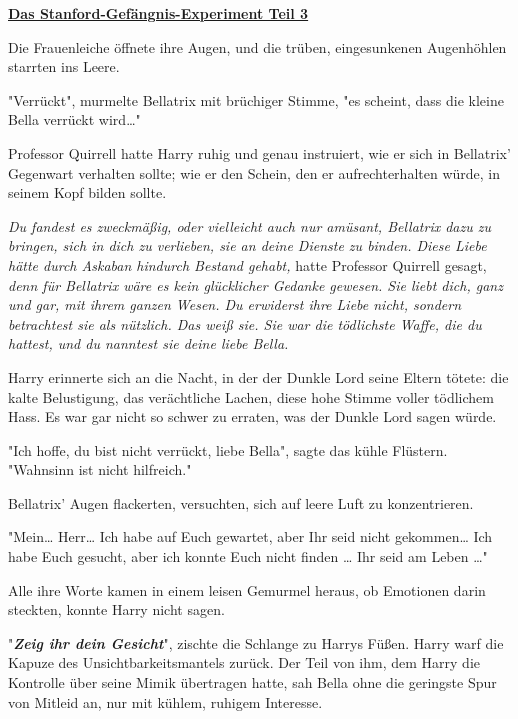 

\hypertarget{das-stanford-gefuxe4ngnis-experiment-teil-3}{%

\textbf{\uline{Das Stanford-Gefängnis-Experiment Teil 3}}

Die Frauenleiche öffnete ihre Augen, und die trüben, eingesunkenen Augenhöhlen starrten ins Leere.

"Verrückt", murmelte Bellatrix mit brüchiger Stimme, "es scheint, dass die kleine Bella verrückt wird…"

Professor Quirrell hatte Harry ruhig und genau instruiert, wie er sich in Bellatrix' Gegenwart verhalten sollte; wie er den Schein, den er aufrechterhalten würde, in seinem Kopf bilden sollte.

\emph{Du fandest es zweckmäßig, oder vielleicht auch nur amüsant, Bellatrix dazu zu bringen, sich in dich zu verlieben, sie an deine Dienste zu binden. Diese Liebe hätte durch Askaban hindurch Bestand gehabt,} hatte Professor Quirrell gesagt, \emph{denn für Bellatrix wäre es kein glücklicher Gedanke gewesen. Sie liebt dich, ganz und gar, mit ihrem ganzen Wesen. Du erwiderst ihre Liebe nicht, sondern betrachtest sie als nützlich. Das weiß sie. Sie war die tödlichste Waffe, die du hattest, und du nanntest sie deine liebe Bella.}

Harry erinnerte sich an die Nacht, in der der Dunkle Lord seine Eltern tötete: die kalte Belustigung, das verächtliche Lachen, diese hohe Stimme voller tödlichem Hass. Es war gar nicht so schwer zu erraten, was der Dunkle Lord sagen würde.

"Ich hoffe, du bist nicht verrückt, liebe Bella", sagte das kühle Flüstern. "Wahnsinn ist nicht hilfreich."

Bellatrix' Augen flackerten, versuchten, sich auf leere Luft zu konzentrieren.

"Mein… Herr… Ich habe auf Euch gewartet, aber Ihr seid nicht gekommen… Ich habe Euch gesucht, aber ich konnte Euch nicht finden … Ihr seid am Leben …"

Alle ihre Worte kamen in einem leisen Gemurmel heraus, ob Emotionen darin steckten, konnte Harry nicht sagen.

"\textbf{\emph{Zeig ihr dein Gesicht}}", zischte die Schlange zu Harrys Füßen. Harry warf die Kapuze des Unsichtbarkeitsmantels zurück. Der Teil von ihm, dem Harry die Kontrolle über seine Mimik übertragen hatte, sah Bella ohne die geringste Spur von Mitleid an, nur mit kühlem, ruhigem Interesse.

}
